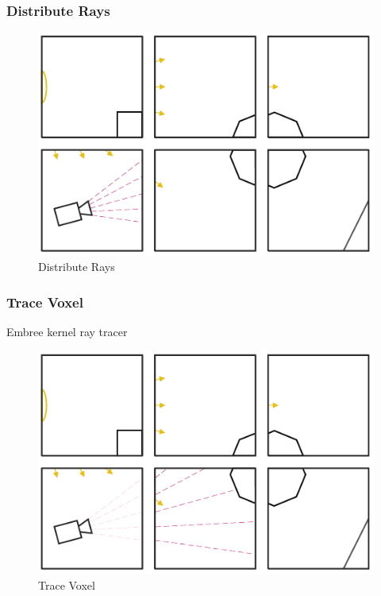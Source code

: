 \documentclass{vgtc}                          %
\begin{document}
\subsubsection{Distribute Rays}

\begin{figure}[htb]
  \centering
  \includegraphics[width=\columnwidth]{drawings/Trace1.pdf}
  \caption{Distribute Rays}
\end{figure}

\subsubsection{Trace Voxel}
Embree kernel ray tracer

\begin{figure}[htb]
  \centering
  \includegraphics[width=\columnwidth]{drawings/Trace2.pdf}
  \caption{Trace Voxel}
\end{figure}
\end{document}
